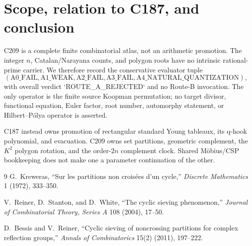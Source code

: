 \documentclass[11pt]{article}
\theoremstyle{definition}
\begin{document}
\section{Scope, relation to C187, and conclusion}

C209 is a complete finite combinatorial atlas, not an arithmetic promotion.
The integer $n$, Catalan/Narayana counts, and polygon roots have no intrinsic
rational-prime carrier.  We therefore record the conservative evaluator tuple
\[
 (\mathrm{A0\_FAIL},\mathrm{A1\_WEAK},\mathrm{A2\_FAIL},
   \mathrm{A3\_FAIL},\mathrm{A4\_NATURAL\_QUANTIZATION}),
\]
with overall verdict `ROUTE\_A\_REJECTED` and no Route-B invocation.  The only
operator is the finite source Koopman permutation; no target divisor,
functional equation, Euler factor, root number, automorphy statement, or
Hilbert--Pólya operator is asserted.

C187 instead owns promotion of rectangular standard Young tableaux, its q-hook
polynomial, and evacuation.  C209 owns set partitions, geometric complement,
the $K^2$ polygon rotation, and the order-$2n$ complement clock.  Shared
Möbius/CSP bookkeeping does not make one a parameter continuation of the other.

\begin{thebibliography}{9}
G.~Kreweras, ``Sur les partitions non croisées d'un cycle,''
\emph{Discrete Mathematics} 1 (1972), 333--350.

V.~Reiner, D.~Stanton, and D.~White, ``The cyclic sieving phenomenon,''
\emph{Journal of Combinatorial Theory, Series A} 108 (2004), 17--50.

D.~Bessis and V.~Reiner, ``Cyclic sieving of noncrossing partitions for
complex reflection groups,'' \emph{Annals of Combinatorics} 15(2) (2011),
197--222.
\end{thebibliography}
\end{document}
